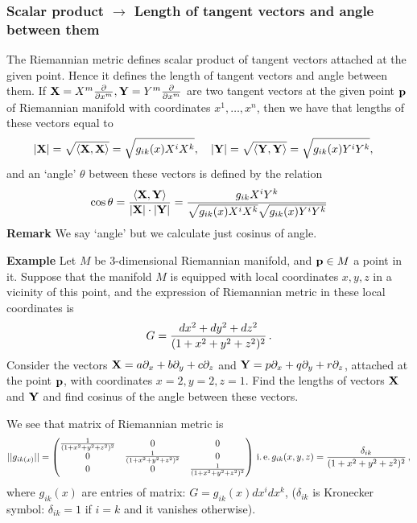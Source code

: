 \documentclass[12pt]{article}
\theoremstyle{theorem}
\numberwithin{equation}{section}
\begin{document}
\subsubsection {Scalar product $\to$
Length of tangent vectors
and angle between them }\label{lengthandangle}

The Riemannian metric defines scalar product of tangent vectors attached at the given point.
Hence it defines the length of tangent vectors and angle between them.
  If ${\bf X}=X^m{\partial \over \partial x^m}, {\bf Y}=Y^m{\partial \over \partial x^m}$ are two tangent vectors at the given point
  ${\bf p}$ of Riemannian manifold with coordinates $x^1,\dots,x^n$, 
  then we have that lengths of
  these vectors equal to
   \begin{equation}\label{lengthandangle1}
    |{\bf X}|=\sqrt {\langle {\bf X},{\bf X}\rangle}=\sqrt {g_{ik}(x)X^iX^k},\quad
    |{\bf Y}|=\sqrt {\langle {\bf Y},{\bf Y}\rangle}=\sqrt {g_{ik}(x)Y^iY^k},\quad
\end{equation}
and an `angle' $\theta$ between these vectors is defined by the relation
         \begin{equation}\label{lengthandangle1}
    \cos\theta={{\langle {\bf X},{\bf Y}\rangle}\over |{\bf X}|\cdot|{\bf Y}|}={g_{ik}X^iY^k\over \sqrt {g_{ik}(x)X^iX^k}
    \sqrt {g_{ik}(x)Y^iY^k}}
\end{equation}
{\bf Remark} We say `angle' but we calculate just cosinus
    of angle.



{\bf Example} Let $M$ be $3$-dimensional Riemannian manifold,
and ${\bf p}\in M$ a point in it. Suppose that
the manifold $M$ is equipped with local coordinates
$x,y,z$ in a vicinity of this point, and
the expression of Riemannian
metric in these local  coordinates is 
      \begin{equation}\label{exampleofconfeuclid}
G={dx^2+dy^2+dz^2\over (1+x^2+y^2+z^2)^2}\,.
           \end{equation}
 Consider the vectors ${\bf X}=a\partial_x+b\partial_y+c\partial_z$ 
and ${\bf Y}=p\partial_x+q\partial_y+r\partial_z$,
attached at the point ${\bf p}$,
with  coordinates
 $x=2,y=2,z=1$.
Find the lengths of vectors ${\bf X}$ 
and ${\bf Y}$ and find cosinus of the angle between
these vectors.

\smallskip

We see that matrix of Riemannian metric is
           \begin{equation*}
        ||g_{ik(x)}||=
    \begin{pmatrix}
     {1\over (1+x^2+y^2+z^2)^2} & 0 &0\cr
      0 &{1\over (1+x^2+y^2+z^2)^2}  &0\cr
    0& 0& {1\over (1+x^2+y^2+z^2)^2} \cr
    \end{pmatrix}\,{\rm i.\,e.}\,
    g_{ik}(x,y,z)={\delta_{ik}\over (1+x^2+y^2+z^2)^2}\,,
           \end{equation*}
where $g_{ik}(x)$ are entries of matrix:
$G=g_{ik}(x)dx^idx^k$,
($\delta_{ik}$ is Kronecker symbol: $\delta_{ik}=1$ if $i=k$
and it vanishes otherwise).
\end{document}
